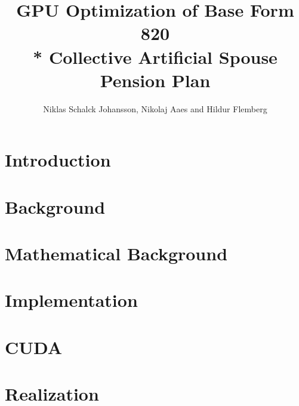 \documentclass[oribibl]{llncs}
\title{GPU Optimization of Base Form 820 \\* Collective Artificial Spouse Pension Plan}
\author{Niklas Schalck Johansson, Nikolaj Aaes and Hildur Flemberg\\
\email{\{nsjo, niaa, hufl\}@itu.dk}}
\institute{IT University of Copenhagen}
\numberwithin{equation}{section}
\begin{document}
	\maketitle
	\tableofcontents
	\pagebreak
	
	
	\begin{abstract}
		
		\label{abstract}
	\end{abstract}
	
	\section{Introduction}
	
	
	\label{introduction}
		
	\section{Background}
		
	
	\label{background}
		
	\section{Mathematical Background}
		
	
	\label{themath}
		
	\section{Implementation}

	
	\label{implementation}
		
	\section{CUDA}

	
	\label{cuda}
	
	\section{Realization}
	
	
	\label{realization}
		
\end{document}
